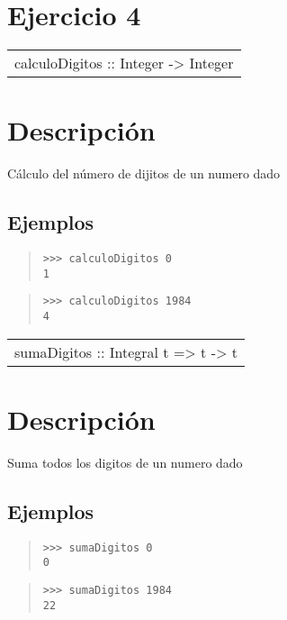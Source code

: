 \section{Ejercicio 4}
\begin{haddockdesc}
\item[\begin{tabular}{@{}l}
calculoDigitos :: Integer -> Integer
\end{tabular}]
{\haddockbegindoc
\section*{Descripción}
Cálculo del número de dijitos de un numero dado\par
\subsection*{Ejemplos}
\begin{quote}
{\haddockverb\begin{verbatim}
>>> calculoDigitos 0
1

\end{verbatim}}
\end{quote}
\begin{quote}
{\haddockverb\begin{verbatim}
>>> calculoDigitos 1984
4

\end{verbatim}}
\end{quote}}
\end{haddockdesc}
\begin{haddockdesc}
\item[\begin{tabular}{@{}l}
sumaDigitos :: Integral t => t -> t
\end{tabular}]
{\haddockbegindoc
\section*{Descripción}
Suma todos los digitos de un numero dado\par
\subsection*{Ejemplos}
\begin{quote}
{\haddockverb\begin{verbatim}
>>> sumaDigitos 0
0

\end{verbatim}}
\end{quote}
\begin{quote}
{\haddockverb\begin{verbatim}
>>> sumaDigitos 1984
22

\end{verbatim}}
\end{quote}}
\end{haddockdesc}
